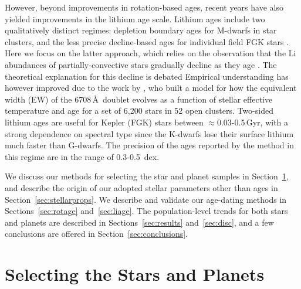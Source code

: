 \documentclass[11pt,twocolumn,tighten]{aastex63}
\begin{document}
However, beyond improvements in rotation-based ages, recent years have
also yielded improvements in the lithium age scale.  Lithium ages
include two qualitatively distinct regimes: depletion boundary ages
for M-dwarfs in star clusters, and the less precise decline-based ages
for individual field FGK stars \citep{Soderblom_2010}.  Here we focus
on the latter approach, which relies on the observation that the Li
abundances of partially-convective stars gradually decline as they age
\citep[e.g.][]{2005A&A...442..615S}.  The theoretical explanation for
this decline is debated
\citep[e.g.][]{1995ApJ...441..865C,2010ApJ...716.1269D,2019MNRAS.485.4052C}
Empirical understanding has however improved due to the work by
\citet{Jeffries_2023}, who built a model for how the equivalent width
(EW) of the  6708\,\AA\ doublet evolves as a function of
stellar effective temperature and age for a set of 6{,}200 stars in 52
open clusters.  Two-sided lithium ages are useful for Kepler (FGK)
stars between $\approx$0.03-0.5\,Gyr, with a strong dependence on
spectral type since the K-dwarfs lose their surface lithium much
faster than G-dwarfs.  The precision of the ages reported by the
\citet{Jeffries_2023} method in this regime are in the range of
0.3-0.5~dex.

We discuss our methods for selecting the star and planet samples in
Section~\ref{sec:selection}, and describe the origin of our adopted
stellar parameters other than ages in Section~\ref{sec:stellarprops}.
We describe and validate our age-dating methods in
Sections~\ref{sec:rotage} and~\ref{sec:liage}.  The population-level
trends for both stars and planets are described in
Sections~\ref{sec:results} and~\ref{sec:disc}, and a few conclusions
are offered in Section~\ref{sec:conclusions}.


\section{Selecting the Stars and Planets}
\label{sec:selection}
\end{document}
